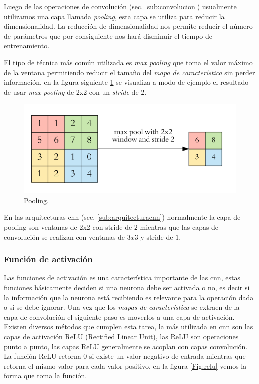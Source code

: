 Luego de las operaciones de convolución (sec. \ref{sub:convolucion}) usualmente utilizamos una capa llamada \textit{pooling}, esta capa se utiliza para reducir la dimensionalidad. La reducción de dimensionalidad nos permite reducir el número de parámetros que por consiguiente nos hará disminuir el tiempo de entrenamiento.

El tipo de técnica más común utilizada es \textit{max pooling} que toma el valor máximo de la ventana permitiendo reducir el tamaño del \textit{mapa de característica} sin perder información, en la figura siguiente \ref{Fig:Pooling} se visualiza a modo de ejemplo el resultado de usar \textit{max pooling} de 2x2 con un \textit{stride} de 2.

\begin{figure}[H]
 \centering
  \includegraphics[scale=0.4,keepaspectratio=true,clip=true]{imagenes/MarcoTeorico/pooling_1.png}
  \caption{Pooling.} \label{Fig:Pooling}%
\end{figure}

En las arquitecturas \ac{cnn} (sec. \ref{sub:arquitecturacnn}) normalmente la capa de pooling son ventanas de 2x2 con stride de $2$ mientras que las capas de  convolución se realizan con ventanas de $3x3$ y stride de $1$. 

\subsubsection{Función de activación}\label{sub:relu}
Las funciones de activación es una característica  importante de las \ac{cnn}, estas funciones básicamente deciden si una neurona debe ser activada o no, es decir si la información que la neurona está recibiendo es relevante para la operación dada o si se debe ignorar. Una vez que los \textit{mapas de característica} se extraen de la capa de convolución el siguiente paso es moverlos a una capa de activación. Existen diversos métodos que cumplen esta tarea, la más utilizada en  \ac{cnn} son las capas de activación ReLU (Rectified Linear Unit), las  ReLU son operaciones punto a punto, las capas ReLU generalmente se acoplan con capas convolución. La función ReLU retorna 0 si existe un valor negativo de entrada mientras que retorna el mismo valor para cada valor positivo, en la figura  \ref{Fig:relu} vemos la forma que toma la función.

